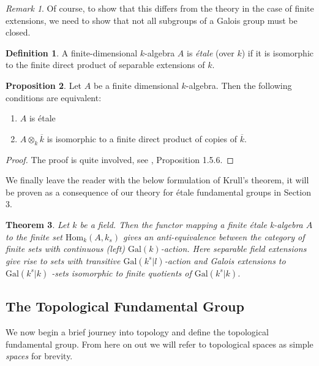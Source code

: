 \documentclass{article}
\newtheorem{theorem}{Theorem}[section]
\theoremstyle{definition}
\newtheorem{proposition}[theorem]{Proposition}
\newtheorem{definition}[theorem]{Definition}
\theoremstyle{remark}
\newtheorem*{remark}{Remark}
\begin{document}
\begin{remark}
	Of course, to show that this differs from the theory in the case of finite extensions, we need to show that not all subgroups of a Galois group must be closed.
\end{remark}

\begin{definition}
	A finite-dimensional $k$-algebra $A$ is \textit{\'etale} (over $k$) if it is isomorphic to the finite direct product of separable extensions of $k$.
\end{definition}

\begin{proposition}
	Let $A$ be a finite dimensional $k$-algebra.
	Then the following conditions are equivalent:
	\begin{enumerate}
		\item $A$ is \'etale
		\item $A \otimes_k \overline{k}$ is isomorphic to a finite direct product of copies of $\overline{k}$.
	\end{enumerate}
\end{proposition}
\begin{proof}
	The proof is quite involved, see \cite{Szamuely}, Proposition 1.5.6.
\end{proof}

We finally leave the reader with the below formulation of Krull's theorem, it will be proven as a consequence of our theory for \'etale fundamental groups in Section 3.

\begin{theorem}
	Let $k$ be a field. 
	Then the functor mapping a finite \'etale k-algebra $A$ to the finite set $\text{Hom}_k(A, k_s)$ gives an anti-equivalence between the category of finite sets with continuous (left) $\text{Gal}(k)$-action.
	Here separable field extensions give rise to sets with transitive $\text{Gal}(k^s|l)$-action and Galois extensions to $\text{Gal}(k^s|k)$ -sets isomorphic to finite quotients of $\text{Gal}(k^s|k)$.
\end{theorem}


\subsection{The Topological Fundamental Group}

We now begin a brief journey into topology and define the topological fundamental group.
From here on out we will refer to topological spaces as simple \textit{spaces} for brevity.
\end{document}
